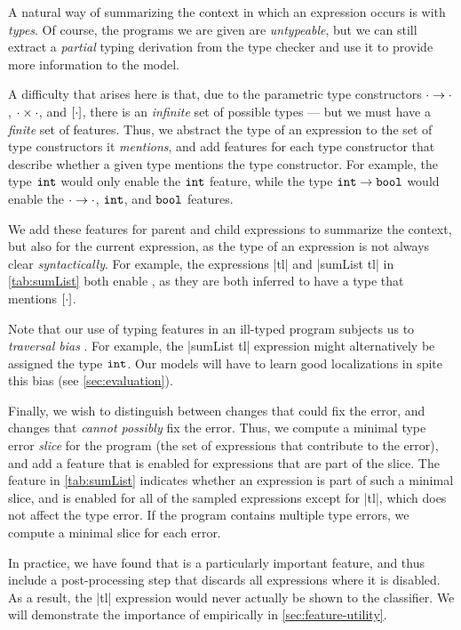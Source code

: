 A natural way of summarizing the context in which an expression occurs is with
\emph{types}. Of course, the programs we are given are \emph{untypeable}, but we
can still extract a \emph{partial} typing derivation from the type checker and
use it to provide more information to the model.

A difficulty that arises here is that, due to the parametric type constructors
$\cdot \to \cdot$, $\cdot \times \cdot$, and $[\cdot]$, there is an
\emph{infinite} set of possible types --- but we must have a \emph{finite} set
of features. Thus, we abstract the type of an expression to the set of type
constructors it \emph{mentions}, and add features for each type constructor that
describe whether a given type mentions the type constructor. For example, the
type $\mathtt{int}$ would only enable the $\mathtt{int}$ feature, while the type
$\mathtt{int} \to \mathtt{bool}$ would enable the $\cdot \to \cdot$, $\mathtt{int}$, and
$\mathtt{bool}$ features.

We add these features for parent and child expressions to summarize the context,
but also for the current expression, as the type of an expression is not always
clear \emph{syntactically}. For example, the expressions |tl| and |sumList tl|
in \autoref{tab:sumList} both enable \HasTypeList, as they are both inferred to
have a type that mentions $[\cdot]$.

Note that our use of typing features in an ill-typed program subjects us to
\emph{traversal bias} \citep{McAdam1998-ub}. For example, the |sumList tl|
expression might alternatively be assigned the type $\mathtt{int}$. Our models will
have to learn good localizations in spite this bias (see
\autoref{sec:evaluation}).

Finally, we wish to distinguish between changes that could fix the error, and
changes that \emph{cannot possibly} fix the error. Thus, we compute a minimal
type error \emph{slice} for the program (\ie the set of expressions that
contribute to the error), and add a feature that is enabled for expressions that
are part of the slice. The \InSlice feature in \autoref{tab:sumList} indicates
whether an expression is part of such a minimal slice, and is enabled for all of
the sampled expressions except for |tl|, which does not affect the type error.
If the program contains multiple type errors, we compute a minimal slice for
each error.

In practice, we have found that \InSlice is a particularly important feature,
and thus include a post-processing step that discards all expressions where it
is disabled. As a result, the |tl| expression would never actually be shown to
the classifier. We will demonstrate the importance of \InSlice empirically in
\autoref{sec:feature-utility}.



